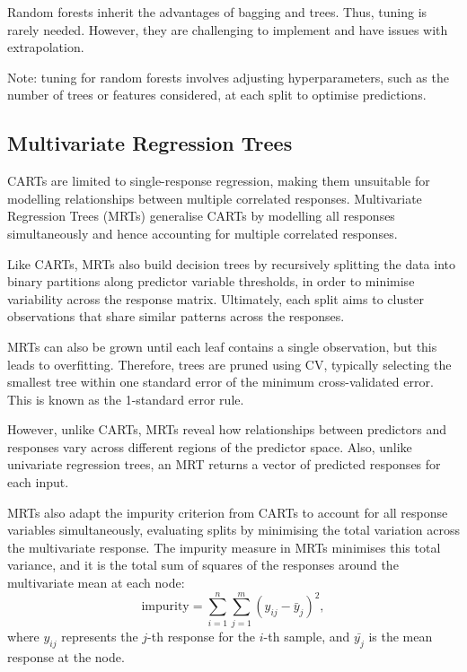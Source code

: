 \documentclass[11pt]{report} %
\begin{document}
Random forests inherit the advantages of bagging and trees. Thus, tuning is rarely needed. However, they are challenging to implement and have issues with extrapolation.

\noindent Note: tuning for random forests involves adjusting hyperparameters, such as the number of trees or features considered, at each split to optimise predictions.

\subsection{Multivariate Regression Trees}
CARTs are limited to single-response regression, making them unsuitable for modelling relationships between multiple correlated responses. Multivariate Regression Trees (MRTs) generalise CARTs by modelling all responses simultaneously and hence accounting for multiple correlated responses.\cite{qcbs_workshop} 

Like CARTs, MRTs also build decision trees by recursively splitting the data into binary partitions along predictor variable thresholds, in order to minimise variability across the response matrix. Ultimately, each split aims to cluster observations that share similar patterns across the responses.\cite{qcbs_workshop} 

MRTs can also be grown until each leaf contains a single observation, but this leads to overfitting. Therefore, trees are pruned using CV, typically selecting the smallest tree within one standard error of the minimum cross-validated error.\cite{death2002multivariate} This is known as the 1-standard error rule.


However, unlike CARTs, MRTs reveal how relationships between predictors and responses vary across different regions of the predictor space.\cite{qcbs_workshop} Also, unlike univariate regression trees, an MRT returns a vector of predicted responses for each input.

MRTs also adapt the impurity criterion from CARTs to account for all response variables simultaneously, evaluating splits by minimising the total variation across the multivariate response.\cite{death2002multivariate} The impurity measure in MRTs minimises this total variance, and it is the total sum of squares of the responses around the multivariate mean at each node:
\[
\text{impurity} = \sum_{i=1}^{n} \sum_{j=1}^{m} \left( y_{ij} - \bar{y}_j \right)^2,
\]
where $y_{ij}$ represents the $j$-th response for the $i$-th sample, and $\bar{y_j}$ is the mean response at the node.\cite{questier2005cart} 
\end{document}
